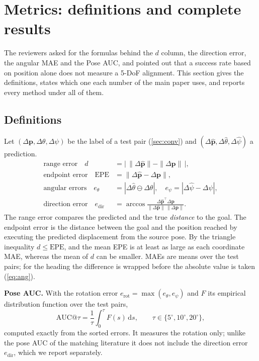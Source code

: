 \documentclass[10pt,twocolumn,letterpaper]{article}
\newcommand{\dth}{\Delta\theta}
\newcommand{\dpsi}{\Delta\psi}
\newcommand{\dpv}{\Delta\mathbf{p}}
\newcommand{\dpvh}{\Delta\hat{\mathbf{p}}}
\newcommand{\wrapd}{\ominus}
\begin{document}
\section{Metrics: definitions and complete results}
\label{sec:metrics}

The reviewers asked for the formulas behind the $d$ column, the direction error, the angular MAE and the Pose AUC, and pointed out that a success rate based on position alone does not measure a 5-DoF alignment. This section gives the definitions, states which one each number of the main paper uses, and reports every method under all of them.

\subsection{Definitions}

Let $(\dpv,\dth,\dpsi)$ be the label of a test pair (\cref{sec:conv}) and $(\dpvh,\Delta\hat\theta,\Delta\hat\psi)$ a prediction.
\begin{align}
\text{range error}\quad d&=\big|\,\|\dpvh\|-\|\dpv\|\,\big|,\label{eq:d}\\
\text{endpoint error}\quad \mathrm{EPE}&=\|\dpvh-\dpv\|,\label{eq:epe}\\
\text{angular errors}\quad e_\theta&=|\Delta\hat\theta\wrapd\dth|,\quad e_\psi=|\Delta\hat\psi-\dpsi|,\label{eq:ang}\\
\text{direction error}\quad e_{\mathrm{dir}}&=\arccos\frac{\dpvh^{\!\top}\dpv}{\|\dpvh\|\,\|\dpv\|}.\label{eq:dir}
\end{align}
The range error compares the predicted and the true \emph{distance} to the goal. The endpoint error is the distance between the goal and the position reached by executing the predicted displacement from the source pose. By the triangle inequality $d\le\mathrm{EPE}$, and the mean EPE is at least as large as each coordinate MAE, whereas the mean of $d$ can be smaller. MAEs are means over the test pairs; for the heading the difference is wrapped before the absolute value is taken (\cref{eq:ang}).

\noindent\textbf{Pose AUC.} With the rotation error $e_{\mathrm{rot}}=\max(e_\theta,e_\psi)$ and $F$ its empirical distribution function over the test pairs,
\begin{equation}
\mathrm{AUC}@\tau=\frac{1}{\tau}\int_0^{\tau}F(s)\,\mathrm{d}s,\qquad \tau\in\{5^\circ,10^\circ,20^\circ\},
\end{equation}
computed exactly from the sorted errors. It measures the rotation only; unlike the pose AUC of the matching literature it does not include the direction error $e_{\mathrm{dir}}$, which we report separately.
\end{document}
